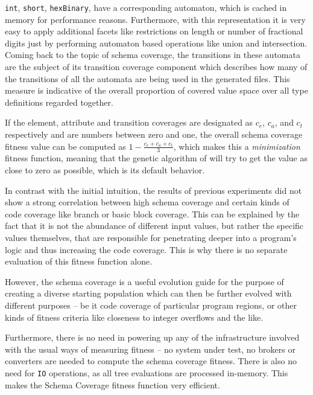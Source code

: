 \begin{description}
  \texttt{int}, \texttt{short}, \texttt{hexBinary}, have a corresponding automaton, which is cached in memory
  for performance reasons. Furthermore, with this representation it is very easy to apply additional facets
  like restrictions on length or number of fractional digits just by performing automaton based operations
  like union and intersection.
  Coming back to the topic of schema coverage, the transitions in these automata are the subject of its 
  transition coverage component which describes how many of the transitions of all the automata are being 
  used in the generated \xml files. This measure is indicative of the overall proportion of covered value space 
  over all type definitions regarded together.
\end{description}

If the element, attribute and transition coverages are designated as $c_e$, $c_a$, and $c_t$ respectively and
are numbers between zero and one, the overall schema coverage fitness value can be computed as $1 -
\frac{c_e+c_a+c_t}{3}$, which makes this a \emph{minimization} fitness function, meaning that the genetic
algorithm of \evosuite will try to get the value as close to zero as possible, which is its default behavior.

In contrast with the initial intuition, the results of previous experiments did not 
show a strong correlation between high schema coverage and certain kinds of code coverage like 
branch or basic block coverage. This can be explained by the fact that it is not the abundance of different 
input values, but rather the specific values themselves, that are responsible for penetrating deeper into a 
program's logic and thus increasing the code coverage. This is why there is no separate evaluation of this
fitness function alone.

However, the schema coverage is a useful evolution guide for the purpose of creating a diverse starting
population which can then be further evolved with different purposes -- be it code coverage of particular program regions, or
other kinds of fitness criteria like closeness to integer overflows and the like.

Furthermore, there is no need in powering up any of the infrastructure involved with the usual ways of
measuring fitness -- no system under test, no brokers or converters are needed to compute the schema coverage
fitness. There is also no need for \texttt{IO} operations, as all \xml tree evaluations are processed
in-memory. This makes the Schema Coverage fitness function very efficient.

